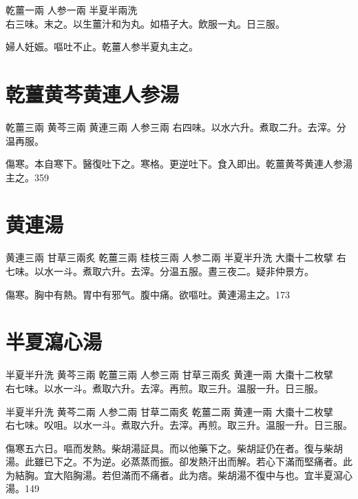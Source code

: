 乾薑{\scriptsize 一兩} 人参{\scriptsize 一兩} 半夏{\scriptsize 半兩洗}\\
右三味。末之。以生薑汁和为丸。如梧子大。飲服一丸。日三服。

{\khaaitp 婦人}妊娠。嘔吐不止。乾薑人参半夏丸主之。

\section{乾薑黄芩黄連人参湯}

乾薑{\scriptsize 三兩} 黄芩{\scriptsize 三兩} 黄連{\scriptsize 三兩} 人参{\scriptsize 三兩}
右四味。以水六升。煮取二升。去滓。分温再服。

傷寒。本自寒下。醫復吐{\khaaitp 下}之。寒格。更逆吐{\khaaitp 下}。食入即出。乾薑黄芩黄連人参湯主之。359

\section{黄連湯}

黄連{\scriptsize 三兩} 甘草{\scriptsize 三兩炙} 乾薑{\scriptsize 三兩} 桂枝{\scriptsize 三兩} 人参{\scriptsize 二兩} 半夏{\scriptsize 半升洗} 大棗{\scriptsize 十二枚擘}
右七味。以水一斗。煮取六升。去滓。分温五服。晝三夜二。疑非仲景方。

傷寒。胸中有熱。胃中有邪气。腹中痛。欲嘔吐。黄連湯主之。173

\section{半夏瀉心湯}

半夏{\scriptsize 半升洗} 黄芩{\scriptsize 三兩} 乾薑{\scriptsize 三兩} 人参{\scriptsize 三兩} 甘草{\scriptsize 三兩炙} 黄連{\scriptsize 一兩} 大棗{\scriptsize 十二枚擘}\\
右七味。以水一斗。煮取六升。去滓。再煎。取三升。温服一升。日三服。{\zhaoben}

半夏{\scriptsize 半升洗} 黄芩{\scriptsize 二兩} 人参{\scriptsize 二兩} 甘草{\scriptsize 二兩炙} 乾薑{\scriptsize 二兩} 黄連{\scriptsize 一兩} 大棗{\scriptsize 十二枚擘}\\
右七味。㕮咀。以水一斗。煮取六升。去滓。再煎。取三升。温服一升。日三服。{\wuben}

傷寒五六日。嘔而发熱。柴胡湯証具。而以他藥下之。柴胡証仍在者。復与柴胡湯。此雖已下之。不为逆。必蒸蒸而振。卻发熱汗出而解。若心下滿而堅痛者。此为結胸。宜大陷胸湯。若但滿而不痛者。此为痞。柴胡{\khaaitp 湯}不復中与也。宜半夏瀉心湯。149

